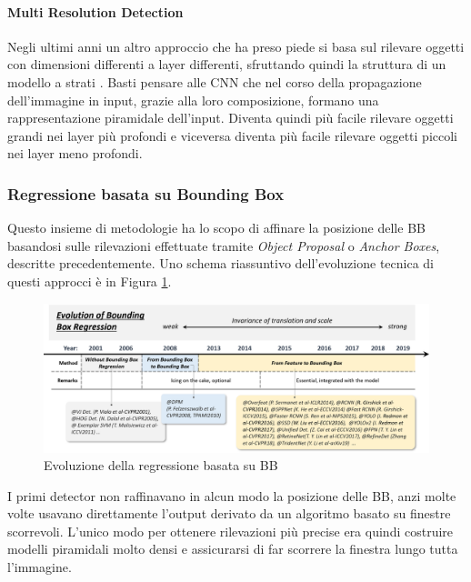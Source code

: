 \paragraph{Multi Resolution Detection}
Negli ultimi anni un altro approccio che ha preso piede si basa sul rilevare oggetti con dimensioni differenti a layer differenti, sfruttando quindi la struttura di un modello a strati \cite{liu2016ssd, lin2017feature, zhang2018single, cai2016unified}. Basti pensare alle \ac{CNN} che nel corso della propagazione dell'immagine in input, grazie alla loro composizione, formano una rappresentazione piramidale dell'input. Diventa quindi più facile rilevare oggetti grandi nei layer più profondi e viceversa diventa più facile rilevare oggetti piccoli nei layer meno profondi. 
\subsubsection{Regressione basata su Bounding Box}
Questo insieme di metodologie ha lo scopo di affinare la posizione delle \ac{BB} basandosi sulle rilevazioni effettuate tramite \textit{Object Proposal} o \textit{Anchor Boxes}, descritte precedentemente. Uno schema riassuntivo dell'evoluzione tecnica di questi approcci è in Figura \ref{fig:bbox_history}.
\begin{figure}
    \centering
    \includegraphics[width=\textwidth]{images/evol-bbreg.png}
    \caption{Evoluzione della regressione basata su \ac{BB} \cite{DBLP:journals/corr/abs-1905-05055}}
    \label{fig:bbox_history}
\end{figure}

I primi detector non raffinavano in alcun modo la posizione delle \ac{BB}, anzi molte volte usavano direttamente l'output derivato da un algoritmo basato su finestre scorrevoli. L'unico modo per ottenere rilevazioni più precise era quindi costruire modelli piramidali molto densi e assicurarsi di far scorrere la finestra lungo tutta l'immagine.
